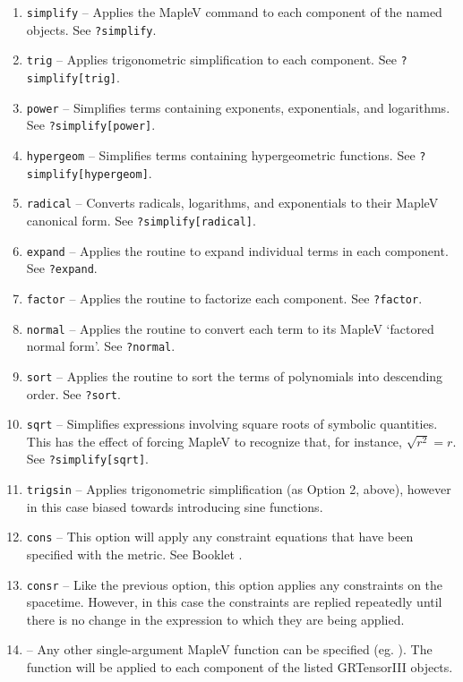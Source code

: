 \documentclass{article}
\begin{document}
{{{\begin{enumerate}
  \item \texttt{simplify} -- Applies the MapleV  command to
    each component of the named objects. See \texttt{?simplify}.
  \item \texttt{trig} -- Applies trigonometric simplification to each
    component. See \texttt{?simplify[trig]}.
  \item \texttt{power} -- Simplifies terms containing exponents, exponentials,
    and logarithms. See \texttt{?simplify[power]}.
  \item \texttt{hypergeom} -- Simplifies terms containing hypergeometric
    functions. See \texttt{?simplify[hypergeom]}.
  \item \texttt{radical} -- Converts radicals, logarithms, and exponentials
    to their MapleV canonical form. See \texttt{?simplify[radical]}.
  \item \texttt{expand} -- Applies the routine  to expand
    individual terms in each component. See \texttt{?expand}.
  \item \texttt{factor} -- Applies the routine  to factorize
    each component. See \texttt{?factor}.
  \item \texttt{normal} -- Applies the routine  to convert each
    term to its MapleV `factored normal form'. See \texttt{?normal}.
  \item \texttt{sort} -- Applies the routine  to sort the terms
    of polynomials into descending order. See \texttt{?sort}.
  \item \texttt{sqrt} -- Simplifies expressions involving square roots of
    symbolic quantities. This has the effect of forcing MapleV to recognize
    that, for instance, $\sqrt{r^2} = r$. See \texttt{?simplify[sqrt]}.
  \item \texttt{trigsin} -- Applies trigonometric simplification (as Option 2,
    above), however in this case biased towards introducing sine functions.
  \item \texttt{cons} -- This option will apply any constraint equations that
    have been specified with the metric. See Booklet \grMakegRef.
  \item \texttt{consr} -- Like the previous option, this option applies
    any constraints on the spacetime. However, in this case the constraints
    are replied repeatedly until there is no change in the expression to
    which they are being applied.   
  \item {} -- Any other single-argument MapleV function can be
    specified (eg. ). The function will be applied to each
    component of the listed GRTensorIII objects.
\end{enumerate}

}}}
\end{document}

